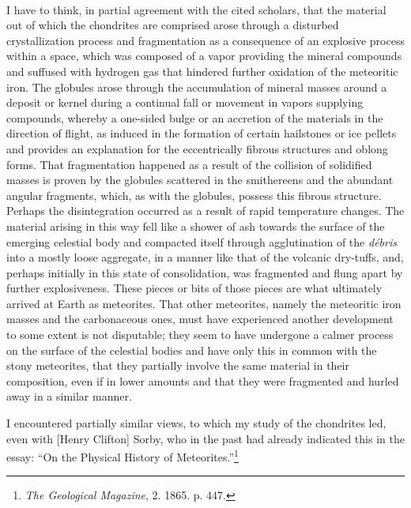 \documentclass[a4paper, 12pt, oneside]{article}
\begin{document}
\paragraph{}
I have to think, in partial agreement with the cited scholars, that the material out of which the chondrites are comprised arose through a disturbed crystallization process and fragmentation as a consequence of an explosive process within a space, which was composed of a vapor providing the mineral compounds and suffused with hydrogen gas that hindered further oxidation of the meteoritic iron. The globules arose through the accumulation of mineral masses around a deposit or kernel during a continual fall or movement in vapors supplying compounds, whereby a one-sided bulge or an accretion of the materials in the direction of flight, as induced in the formation of certain hailstones or ice pellets and provides an explanation for the eccentrically fibrous structures and oblong forms. That fragmentation happened as a result of the collision of solidified masses is proven by the globules scattered in the smithereens and the abundant angular fragments, which, as with the globules, possess this fibrous structure. Perhaps the disintegration occurred as a result of rapid temperature changes. The material arising in this way fell like a shower of ash towards the surface of the emerging celestial body and compacted itself through agglutination of the \emph{débris} into a mostly loose aggregate, in a manner like that of the volcanic dry-tuffs, and, perhaps initially in this state of consolidation, was fragmented and flung apart by further explosiveness. These pieces or bits of those pieces are what ultimately arrived at Earth as meteorites. That other meteorites, namely the meteoritic iron masses and the carbonaceous ones, must have experienced another development to some extent is not disputable; they seem to have undergone a calmer process on the surface of the celestial bodies and have only this in common with the stony meteorites, that they partially involve the same material in their composition, even if in lower amounts and that they were fragmented and hurled away in a similar manner.

I encountered partially similar views, to which my study of the chondrites led, even with [Henry Clifton] Sorby, who in the past had already indicated this in the essay: ``On the Physical History of Meteorites.''\footnote{\emph{The Geological Magazine}, 2. 1865. p. 447.}
\end{document}
